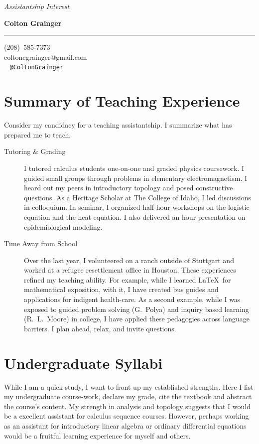 \documentclass[10pt]{article}
\newcommand\textbox[1]{\parbox{.333\textwidth}{#1} }
\begin{document}

\noindent\textbox{\emph{Assistantship Interest }\hfill}\textbox{\hfill{\large\textbf{Colton Grainger}\hfill}}

\vspace{-9pt}
\noindent\rule{\textwidth}{1pt}

\vspace{-9pt}
\begin{flushright} 
(208)~585-7373\\ coltoncgrainger@gmail.com\\ \faTwitter\ \faGithub\hspace{1ex} {\tt @ColtonGrainger} 
\end{flushright}
\vspace{-10pt}

\section*{Summary of Teaching Experience}
Consider my candidacy for a teaching assistantship. I summarize what has prepared me to teach. 
\begin{description}
	\item[Tutoring \& Grading] I tutored calculus students one-on-one and graded physics coursework. I guided small groups through problems in elementary electromagnetism. I heard out my peers in introductory topology and posed constructive questions. As a Heritage Scholar at The College of Idaho, I led discussions in colloquium. In seminar, I organized half-hour workshops on the logistic equation and the heat equation. I also delivered an hour presentation on epidemiological modeling. 
	\item[Time Away from School] Over the last year, I volunteered on a ranch outside of Stuttgart and worked at a refugee resettlement office in Houston. These experiences refined my teaching ability. For example, while I learned \LaTeX\ for mathematical exposition, with it, I have created bus guides and applications for indigent health-care. As a second example, while I was exposed to guided problem solving (G.~Polya) and inquiry based learning (R.~L.~Moore) in college, I have applied these pedagogies across language barriers. I plan ahead, relax, and invite questions.
\end{description}

\section*{Undergraduate Syllabi}
While I am a quick study, I want to front up my established strengths. Here I list my undergraduate course-work, declare my grade, cite the textbook and abstract the course's content. My strength in analysis and topology suggests that I would be a excellent assistant for calculus sequence courses. However, perhaps working as an assistant for introductory linear algebra or ordinary differential equations would be a fruitful learning experience for myself and others.
\end{document}
